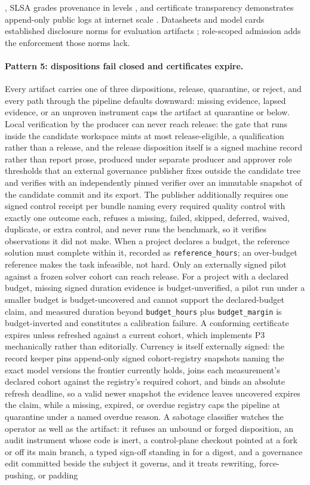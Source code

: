 \documentclass[11pt]{article}
\begin{document}
\citep{newman2022sigstore}, SLSA grades provenance in levels \citep{slsa2023spec}, and certificate transparency demonstrates append-only public logs at internet scale \citep{laurie2013rfc6962}. Datasheets and model cards established disclosure norms for evaluation artifacts \citep{gebru2021datasheets, mitchell2019modelcards}; role-scoped admission adds the enforcement those norms lack.

\paragraph{Pattern 5: dispositions fail closed and certificates expire.}
Every artifact carries one of three dispositions, release, quarantine, or reject, and every path through the pipeline defaults downward: missing evidence, lapsed evidence, or an unproven instrument caps the artifact at quarantine or below. Local verification by the producer can never reach release: the gate that runs inside the candidate workspace mints at most release-eligible, a qualification rather than a release, and the release disposition itself is a signed machine record rather than report prose, produced under separate producer and approver role thresholds that an external governance publisher fixes outside the candidate tree and verifies with an independently pinned verifier over an immutable snapshot of the candidate commit and its export. The publisher additionally requires one signed control receipt per bundle naming every required quality control with exactly one outcome each, refuses a missing, failed, skipped, deferred, waived, duplicate, or extra control, and never runs the benchmark, so it verifies observations it did not make. When a project declares a budget, the reference solution must complete within it, recorded as \texttt{reference\_hours}; an over-budget reference makes the task infeasible, not hard. Only an externally signed pilot against a frozen solver cohort can reach release. For a project with a declared budget, missing signed duration evidence is budget-unverified, a pilot run under a smaller budget is budget-uncovered and cannot support the declared-budget claim, and measured duration beyond \texttt{budget\_hours} plus \texttt{budget\_margin} is budget-inverted and constitutes a calibration failure. A conforming certificate expires unless refreshed against a current cohort, which implements P3 mechanically rather than editorially. Currency is itself externally signed: the record keeper pins append-only signed cohort-registry snapshots naming the exact model versions the frontier currently holds, joins each measurement's declared cohort against the registry's required cohort, and binds an absolute refresh deadline, so a valid newer snapshot the evidence leaves uncovered expires the claim, while a missing, expired, or overdue registry caps the pipeline at quarantine under a named overdue reason. A sabotage classifier watches the operator as well as the artifact: it refuses an unbound or forged disposition, an audit instrument whose code is inert, a control-plane checkout pointed at a fork or off its main branch, a typed sign-off standing in for a digest, and a governance edit committed beside the subject it governs, and it treats rewriting, force-pushing, or padding 
\end{document}
